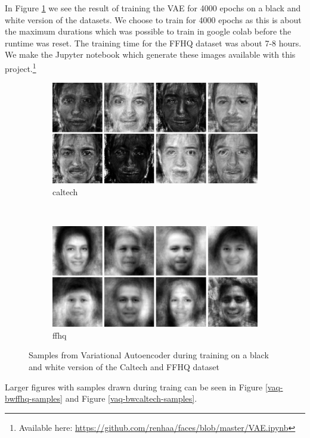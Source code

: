 In Figure \ref{vaeresults} we see the result of training the VAE for 4000 epochs on a black and white version of the datasets. We choose to train for 4000 epochs as this is about the maximum durations which was possible to train in google colab before the runtime was reset. The training time for the FFHQ dataset was about 7-8 hours. We make the Jupyter notebook which generate these images available with this project.\footnote{Available here: \url{ https://github.com/renhaa/faces/blob/master/VAE.ipynb}}

\begin{figure}[h!]
\centering
\begin{subfigure}[b]{0.45\textwidth}
     \includegraphics[width=\textwidth]{fig/vae/caltech_epoch4000}
    \caption{caltech}
\end{subfigure}
    ~
\begin{subfigure}[b]{0.45\textwidth}
     \includegraphics[width=\textwidth]{fig/vae/ffhq_epoch4000}
    \caption{ffhq}
\end{subfigure}
\caption{Samples from Variational Autoencoder during training on a black and white version of the Caltech and FFHQ dataset}
\label{vaeresults}
\end{figure}

Larger figures with samples drawn during traing can be seen in Figure \ref{vaq-bwffhq-samples} and Figure \ref{vaq-bwcaltech-samples}. 

